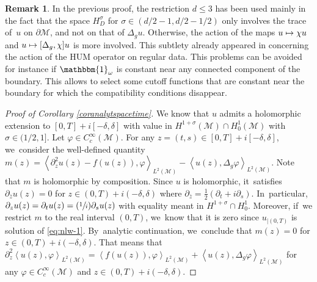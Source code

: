 \documentclass[JEP,XML,SOM,Unicode,published]{cedram}
\newcommand{\Psfrac}[2]{(\sfrac{#1}{#2})}
\newcommand\mto{\mathchoice{\longmapsto}{\mapsto}{\mapsto}{\mapsto}}
\theoremstyle{definition}
\newtheorem{remark}[theorem]{Remark}
\let\mc\mathcal
\newcommand{\M}{\mc{M}}
\begin{document}
\begin{remark}\label{rk:comm-reg}
In the previous proof, the restriction $d\leq 3$ has been used mainly in the fact that the space $H^{\sigma}_D$ for $\sigma\in (d/2-1, d/2-1/2)$ only involves the trace of~$u$ on $\partial \M$, and not on that of $\Delta_g u$. Otherwise, the action of the maps $u \mto \chi u$ and $u \mto [\Delta_g, \chi ]u$ is more involved. This subtlety already appeared in \cite{DL:09} concerning the action of the HUM operator on regular data. This problems can be avoided for instance if $\mathbbm{1}_{\omega}$ is constant near any connected component of the boundary. This allows to select some cutoff functions that are constant near the boundary for which the compatibility conditions disappear.
\end{remark}

\begin{proof}[Proof of Corollary \ref{coranalytspacetime}]
We know that $u$ admits a holomorphic extension to $[0,T]+i[-\delta,\delta]$ with value in $H^{1+\sigma}(\M)\cap H^1_0(\M)$ with $\sigma\in (1/2,1]$. Let $\varphi\in C^{\infty}_c(\M)$. For any $z=(t,s)\in [0,T]+i[-\delta,\delta]$, we~consider the well-defined quantity $m(z)=\left<\partial_z^2u(z)-f(u(z)),\varphi\right>_{L^2(\M)}-\left<u(z),\Delta_g \varphi\right>_{L^2(\M)}$. Note that $m$ is holomorphic by composition. Since $u$ is holomorphic, it~satisfies $\partial_{\bar z}u(z)=0$ for $z\in (0,T)+i(-\delta,\delta)$ where $\partial_{\bar z}=\frac{1}{2}\left(\partial_t+i\partial_s\right)$. In~particular, $\partial_{z}u(z)=\partial_t u(z)=\Psfrac{1}{i}\partial_s u(z)$ with equality meant in $H^{1+\sigma}\cap H^1_0$. Moreover, if~we restrict $m$ to the real interval $(0,T)$, we~know that it is zero since $u_{\left|(0,T)\right.}$ is solution of \eqref{eq:nlw-1}. By~analytic continuation, we~conclude that $m(z)=0$ for $z\in (0,T)+i(-\delta,\delta)$. That means that $\partial_z^2 \left<u(z),\varphi\right>_{L^2(\M)}=\left<f(u(z)),\varphi\right>_{L^2(\M)}+\left<u(z),\Delta_g \varphi\right>_{L^2(\M)}$ for any $\varphi\in C^{\infty}_c(\M)$ and $z\in (0,T)+i(-\delta,\delta)$.


\end{proof}
\end{document}

